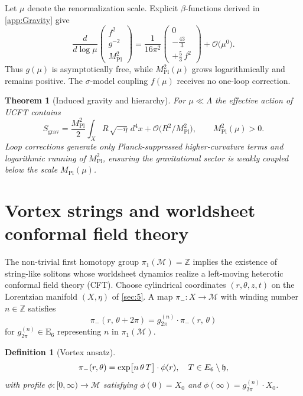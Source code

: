 \documentclass[pdflatex,sn-mathphys-num]{sn-jnl}
\theoremstyle{thmstyleone}
\newtheorem{theorem}{Theorem}
\theoremstyle{thmstyletwo}%
\theoremstyle{thmstylethree}%
\newtheorem{definition}{Definition}%
\newcommand{\E}[1]{\mathrm{E_{#1}}}
\newcommand{\ESix}{\E{6}}
\begin{document}
Let \(\mu\) denote the renormalization scale.
Explicit $\beta$-functions derived in \autoref{app:Gravity} give
\[
  \frac{d}{d\log\mu}
  \begin{pmatrix}
    f^{2}\\[4pt]
    g^{-2}\\[4pt]
    M_{\text{Pl}}^{2}
  \end{pmatrix}
  =\frac{1}{16\pi^{2}}
  \begin{pmatrix}
     0 \\[2pt]
     -\tfrac{43}{3} \\[2pt]
     +\tfrac{5}{3}\,f^{2}
  \end{pmatrix}
  +\mathcal O\bigl(\mu^{0}\bigr).
\]
Thus \(g(\mu)\) is asymptotically free, while
\(M_{\text{Pl}}^{2}(\mu)\) grows logarithmically and remains positive.
The $\sigma$-model coupling \(f(\mu)\) receives no one-loop correction.

\begin{theorem}[Induced gravity and hierarchy]\label{thm:GravitySummary}
For $\mu\ll\Lambda$ the effective action of UCFT contains
\[
  S_{\text{grav}}
  =
  \frac{M_{\text{Pl}}^{2}}{2}\int_{X} R\,\sqrt{-\eta}\,d^{4}x
  +\mathcal O\bigl(R^{2}/M_{\text{Pl}}^{2}\bigr),
  \qquad
  M_{\text{Pl}}^{2}(\mu)>0.
\]
Loop corrections generate only Planck-suppressed higher-curvature terms
and logarithmic running of \(M_{\text{Pl}}^{2}\), ensuring the
gravitational sector is weakly coupled below the scale
\(M_{\text{Pl}}(\mu)\).
\end{theorem}

\section{Vortex strings and worldsheet conformal field theory}
\label{sec:8}
The non-trivial first homotopy group
\(\pi_{1}(\mathcal M)=\mathbb Z\) implies the existence of
string-like solitons whose worldsheet dynamics
realize a left-moving heterotic conformal field theory (CFT). Choose cylindrical coordinates \((r,\theta,z,t)\) on the
Lorentzian manifold \((X,\eta)\) of \autoref{sec:5}. A map
\(\pi_-:X\to\mathcal M\) with winding number \(n\in\mathbb Z\) satisfies
\[\pi_-(r,\,\theta+2\pi) = g_{2\pi}^{(n)}\cdot\pi_-(r,\,\theta)\]
for \(g_{2\pi}^{(n)}\in \ESix\) representing \(n\) in
\(\pi_{1}(\mathcal M)\).

\begin{definition}[Vortex ansatz]
\[
  \pi_-(r,\theta)
  = \exp\bigl[n\,\theta\,T\bigr]\cdot\phi(r),
  \quad
  T\in\mathfrak \ESix\setminus\mathfrak h,
\]
with profile \(\phi:[0,\infty)\to\mathcal M\) satisfying
\(\phi(0)=X_{0}\) and \(\phi(\infty)=g_{2\pi}^{(n)}\cdot X_{0}\).
\end{definition}
\end{document}
